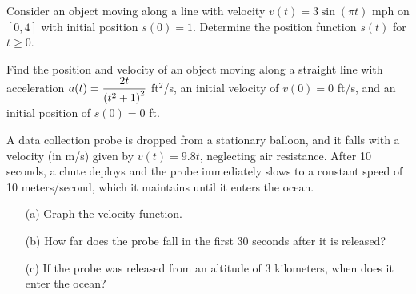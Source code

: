 \documentclass[12pt]{article}
\begin{document}
\newpage

\Example Consider an object moving along a line with velocity $v(t)=3\sin\left(\pi t\right)$ mph on $[0,4]$ with initial position $s(0)=1$. Determine the position function $s(t)$ for $t\geq 0$.

\newpage

\Example Find the position and velocity of an object moving along a straight line with acceleration $a(t)=\displaystyle\frac{2t}{\left( t^2+1\right)^2}$ ft$^2$/s, an initial velocity of $v(0)=0$ ft/s, and an initial position of $s(0)=0$ ft.

\newpage

\Example A data collection probe is dropped from a stationary balloon, and it falls with a velocity (in m/s) given by $v(t)=9.8t$, neglecting air resistance. After 10 seconds, a chute deploys and the probe immediately slows to a constant speed of 10 meters/second, which it maintains until it enters the ocean.

\begin{enumerate}
\item[(a)] Graph the velocity function.

\vspace{50mm}

\item[(b)] How far does the probe fall in the first 30 seconds after it is released?

\vspace{50mm}

\item[(c)] If the probe was released from an altitude of 3 kilometers, when does it enter the ocean?
\end{enumerate}
\end{document}
